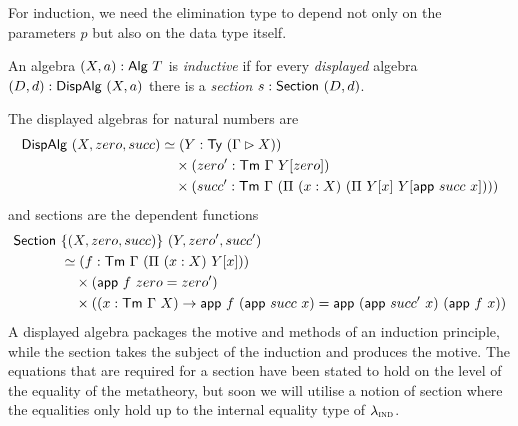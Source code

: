 For induction, we need the elimination type to depend not only on the parameters $p$
but also on the data type itself.
\begin{definition}
	An algebra $(X, a) : \textsf{Alg}\ T$ is \emph{inductive} if for every
	\emph{displayed} algebra $(D, d) : \textsf{DispAlg}\ (X, a)$ there is a
	\emph{section} $s : \textsf{Section}\ (D, d)$.
\end{definition}
The displayed algebras for natural numbers are
\begin{align*}
	\mta{DispAlg}\ (X, zero, succ) & \simeq (Y : \Ty\ (\Gamma \rhd X))                                                      \\
	                               & \quad \times (zero' : \Tm\ \Gamma\ Y[zero])                                            \\
	                               & \quad \times (succ' : \Tm\ \Gamma\ (\Pi\ (x : X)\ (\Pi\ Y[x]\ Y[\mta{app}\ succ\ x])))
\end{align*}
and sections are the dependent functions
\begin{align*}
	\mta{Section}\  & \{(X, zero, succ)\}\ (Y, zero', succ')                                                                                           \\
	                & \simeq (f : \Tm\ \Gamma\ (\Pi\ (x : X)\ Y[x]))                                                                                   \\
	                & \quad \times (\mta{app}\ f\ zero = zero')                                                                                        \\
	                & \quad \times ((x : \Tm\ \Gamma\ X) \to \mta{app}\ f\ (\mta{app}\ succ\ x) = \mta{app}\ (\mta{app}\ succ'\ x)\ (\mta{app}\ f\ x))
\end{align*}
A displayed algebra packages the motive and methods of an induction principle, while the
section takes the subject of the induction and produces the motive.
The equations that are required for a section have been stated to hold on the level of the
equality of the metatheory, but soon we will utilise a notion of section where the equalities
only hold up to the internal equality type of $\lambda_{\textsc{ind}}$.

